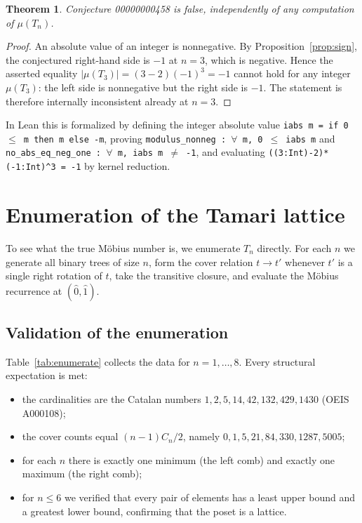 \documentclass[11pt]{article}
\newtheorem{theorem}{Theorem}
\theoremstyle{definition}
\begin{document}
\begin{theorem}\label{thm:false-sign}
Conjecture 00000000458 is false, independently of any computation of
$\mu(T_n)$.
\end{theorem}

\begin{proof}
An absolute value of an integer is nonnegative. By
Proposition~\ref{prop:sign}, the conjectured right-hand side is $-1$ at
$n=3$, which is negative. Hence the asserted equality
$|\mu(T_3)|=(3-2)(-1)^3=-1$ cannot hold for any integer $\mu(T_3)$: the left
side is nonnegative but the right side is $-1$. The statement is therefore
internally inconsistent already at $n=3$.
\end{proof}

In Lean this is formalized by defining the integer absolute value
\texttt{iabs\ m\ =\ if\ 0\ \ensuremath{\le}\ m\ then\ m\ else\ -m},
proving \texttt{modulus\_nonneg : $\forall$ m, 0 $\le$ iabs m} and
\texttt{no\_abs\_eq\_neg\_one : $\forall$ m, iabs m $\ne$ -1}, and
evaluating \texttt{((3:Int)-2)*(-1:Int)\^{}3 = -1} by kernel reduction.

\section{Enumeration of the Tamari lattice}

To see what the true M\"obius number is, we enumerate $T_n$ directly. For
each $n$ we generate all binary trees of size $n$, form the cover relation
$t\to t'$ whenever $t'$ is a single right rotation of $t$, take the
transitive closure, and evaluate the M\"obius recurrence at
$(\hat0,\hat1)$.

\subsection{Validation of the enumeration}

Table~\ref{tab:enumerate} collects the data for $n=1,\dots,8$. Every
structural expectation is met:

\begin{itemize}
\item the cardinalities are the Catalan numbers
$1,2,5,14,42,132,429,1430$ (OEIS A000108);
\item the cover counts equal $(n-1)C_n/2$, namely
$0,1,5,21,84,330,1287,5005$;
\item for each $n$ there is exactly one minimum (the left comb) and exactly
one maximum (the right comb);
\item for $n\le 6$ we verified that every pair of elements has a least upper
bound and a greatest lower bound, confirming that the poset is a lattice.
\end{itemize}
\end{document}
